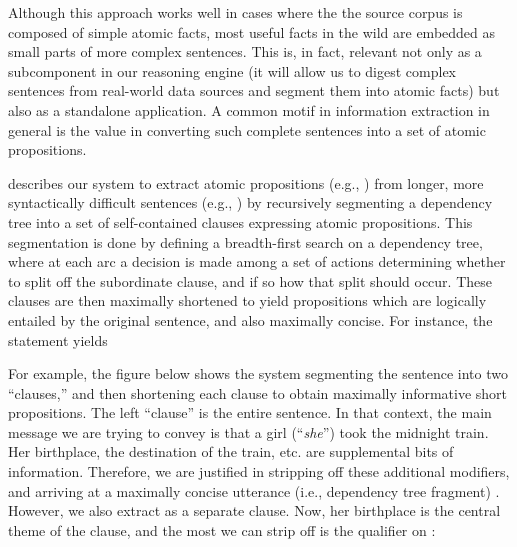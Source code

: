 %
%
Although this approach works well in cases where the the source corpus is composed
  of simple atomic facts, most useful facts in the wild are embedded as small parts
  of more complex sentences.
This is, in fact, relevant not only as a
  subcomponent in our reasoning engine (it will allow us to digest complex
  sentences from real-world data sources and segment them into atomic facts)
  but also as a standalone application.
A common motif in information extraction in general is the value in 
  converting such complete sentences into a set of atomic propositions.

 describes our system to extract atomic propositions (e.g., 
  ) from longer, more syntactically difficult 
  sentences (e.g., ) by recursively 
  segmenting a dependency tree into a set of self-contained clauses expressing 
  atomic propositions.
This segmentation is done by defining a breadth-first search on a dependency tree,
  where at each arc a decision is made among a set of actions determining whether
  to split off the subordinate clause, and if so how that split should occur.
These clauses are then maximally shortened to yield propositions which are
  logically entailed by the original sentence, and also maximally concise.
For instance, the statement 
  yields  

For example, the figure below shows the system segmenting the sentence
   into
  two ``clauses,'' and then shortening each clause to obtain maximally informative
  short propositions.
The left ``clause'' is the entire sentence.
In that context, the main message we are trying to convey is that a girl (``\textit{she}'') 
  took the midnight train.
Her birthplace, the destination of the train, etc. are supplemental bits of information.
Therefore, we are justified in stripping off these additional modifiers, and arriving
  at a maximally concise utterance (i.e., dependency tree fragment) .
However, we also extract  as a separate clause.
Now, her birthplace is the central theme of the clause, and the most we can strip off is the qualifier
   on :

